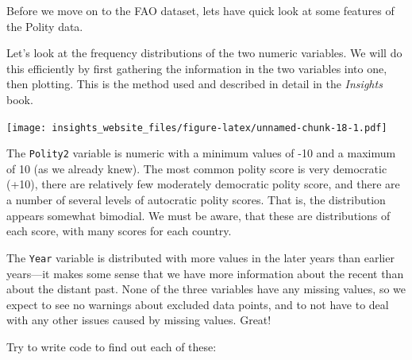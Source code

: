 \documentclass[]{book}
\newenvironment{Shaded}{\begin{snugshade}}{\end{snugshade}}
\newcommand{\DataTypeTok}[1]{\textcolor[rgb]{0.13,0.29,0.53}{#1}}
\newcommand{\DecValTok}[1]{\textcolor[rgb]{0.00,0.00,0.81}{#1}}
\newcommand{\KeywordTok}[1]{\textcolor[rgb]{0.13,0.29,0.53}{\textbf{#1}}}
\newcommand{\NormalTok}[1]{#1}
\newcommand{\OperatorTok}[1]{\textcolor[rgb]{0.81,0.36,0.00}{\textbf{#1}}}
\newcommand{\StringTok}[1]{\textcolor[rgb]{0.31,0.60,0.02}{#1}}
\begin{document}
Before we move on to the FAO dataset, lets have quick look at some features of the Polity data.

Let's look at the frequency distributions of the two numeric variables. We will do this efficiently by first gathering the information in the two variables into one, then plotting. This is the method used and described in detail in the \emph{Insights} book.

\begin{Shaded}
\end{Shaded}

\texttt{[image: insights\_website\_files/figure-latex/unnamed-chunk-18-1.pdf]}

The \texttt{Polity2} variable is numeric with a minimum values of -10 and a maximum of 10 (as we already knew). The most common polity score is very democratic (+10), there are relatively few moderately democratic polity score, and there are a number of several levels of autocratic polity scores. That is, the distribution appears somewhat bimodial. We must be aware, that these are distributions of each score, with many scores for each country.

The \texttt{Year} variable is distributed with more values in the later years than earlier years---it makes some sense that we have more information about the recent than about the distant past. None of the three variables have any missing values, so we expect to see no warnings about excluded data points, and to not have to deal with any other issues caused by missing values. Great!

Try to write code to find out each of these:
\end{document}

